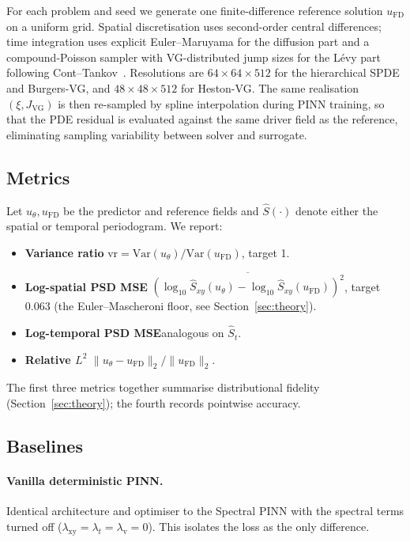 \documentclass[review,12pt]{elsarticle}
\begin{document}
For each problem and seed we generate one finite-difference
reference solution \(u_{\mathrm{FD}}\) on a uniform grid. Spatial
discretisation uses second-order central differences; time
integration uses explicit Euler--Maruyama for the diffusion part
and a compound-Poisson sampler with VG-distributed jump sizes for
the L\'evy part following Cont--Tankov~\cite{ContTankov2003}.
Resolutions are \(64\times 64 \times 512\) for the hierarchical
SPDE and Burgers-VG, and \(48\times 48 \times 512\) for
Heston-VG. The same realisation \((\xi, J_{\mathrm{VG}})\) is then
re-sampled by spline interpolation during PINN training, so that
the PDE residual is evaluated against the same driver field as
the reference, eliminating sampling variability between solver and
surrogate.

\subsection{Metrics}
\label{subsec:metrics}

Let \(u_\theta, u_{\mathrm{FD}}\) be the predictor and reference
fields and \(\widehat S(\cdot)\) denote either the spatial or
temporal periodogram. We report:
\begin{itemize}
\item \textbf{Variance ratio}\quad
\(\mathrm{vr} = \mathrm{Var}(u_\theta)/\mathrm{Var}(u_{\mathrm{FD}})\),
target 1.
\item \textbf{Log-spatial PSD MSE}\quad
\(\overline{(\log_{10}\widehat S_{xy}(u_\theta) -
\log_{10}\widehat S_{xy}(u_{\mathrm{FD}}))^2}\), target 0.063
(the Euler--Mascheroni floor, see Section~\ref{sec:theory}).
\item \textbf{Log-temporal PSD MSE}\quad analogous on
\(\widehat S_t\).
\item \textbf{Relative \(L^2\)}\quad
\(\|u_\theta - u_{\mathrm{FD}}\|_2 / \|u_{\mathrm{FD}}\|_2\).
\end{itemize}
The first three metrics together summarise distributional
fidelity (Section~\ref{sec:theory}); the fourth records pointwise
accuracy.

\subsection{Baselines}

\paragraph{Vanilla deterministic PINN.} Identical architecture and
optimiser to the Spectral PINN with the spectral terms turned off
(\(\lambda_{\mathrm{xy}} = \lambda_t = \lambda_{\mathrm v} = 0\)).
This isolates the loss as the only difference.
\end{document}
